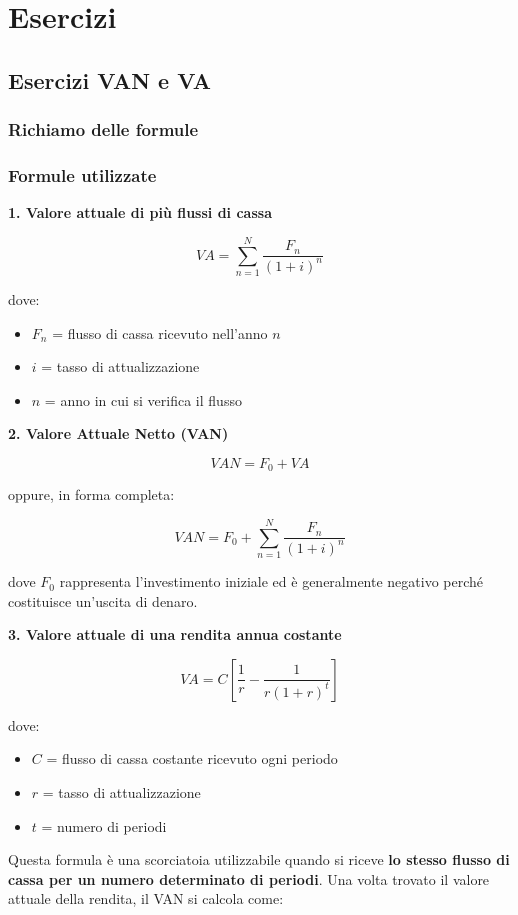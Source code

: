 \chapter{Esercizi}
\section{Esercizi VAN e VA}

\subsection{Richiamo delle formule}
\subsection*{Formule utilizzate}

\noindent\textbf{1. Valore attuale di più flussi di cassa}

\[
VA=\sum_{n=1}^{N}\frac{F_n}{(1+i)^n}
\]

\noindent dove:
\begin{itemize}
    \item $F_n$ = flusso di cassa ricevuto nell'anno $n$
    \item $i$ = tasso di attualizzazione
    \item $n$ = anno in cui si verifica il flusso
\end{itemize}

\noindent\textbf{2. Valore Attuale Netto (VAN)}

\[
VAN=F_0+VA
\]

\noindent oppure, in forma completa:

\[
VAN=F_0+\sum_{n=1}^{N}\frac{F_n}{(1+i)^n}
\]

\noindent dove $F_0$ rappresenta l'investimento iniziale ed è generalmente
negativo perché costituisce un'uscita di denaro.

\noindent\textbf{3. Valore attuale di una rendita annua costante}

\[
VA=C\left[
\frac{1}{r}
-\frac{1}{r(1+r)^t}
\right]
\]

\noindent dove:
\begin{itemize}
    \item $C$ = flusso di cassa costante ricevuto ogni periodo
    \item $r$ = tasso di attualizzazione
    \item $t$ = numero di periodi
\end{itemize}

\noindent Questa formula è una scorciatoia utilizzabile quando si riceve
\textbf{lo stesso flusso di cassa per un numero determinato di periodi}.
Una volta trovato il valore attuale della rendita, il VAN si calcola come:

